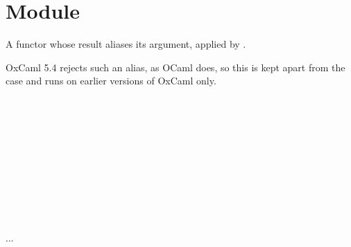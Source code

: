 \section{Module }\label{Oxcaml_functor_alias}%
A functor whose result aliases its argument, applied by .

OxCaml 5.4 rejects such an alias, as OCaml does, so this is kept apart from the  case and runs on earlier versions of OxCaml only.

\label{Oxcaml_functor_alias--module-Make}\\
\label{Oxcaml_functor_alias--type-t}\\
\label{Oxcaml_functor_alias--type-p}\\
\label{Oxcaml_functor_alias--module-X}\label{Oxcaml_functor_alias-X}\begin{ocamlindent}\label{Oxcaml_functor_alias-X--type-v}\\
\end{ocamlindent}%
\\
\label{Oxcaml_functor_alias--module-type-S}\label{Oxcaml_functor_alias-module-type-S}\begin{ocamlindent}\label{Oxcaml_functor_alias-module-type-S--type-u}\\
\end{ocamlindent}%
\\
 .\allowbreak{}.\allowbreak{}.\allowbreak{}\label{Oxcaml_functor_alias--val-via_module_type_include}\\
